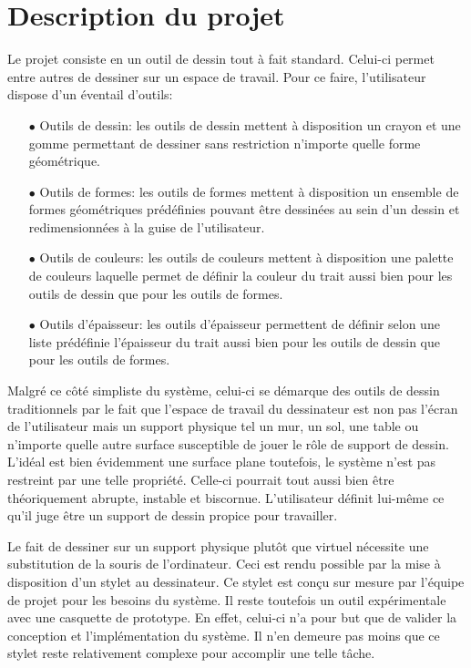 \documentclass[11pt,a4paper,oldfontcommands]{memoir}
\begin{document}
\section{Description du projet}

Le projet consiste en un outil de dessin tout à fait standard. Celui-ci permet entre autres de dessiner sur un espace de travail. Pour ce faire, l'utilisateur dispose d'un éventail d'outils:

\begin{itemize}
\item[$\bullet$] Outils de dessin: les outils de dessin mettent à disposition un crayon et une gomme permettant de dessiner sans restriction n'importe quelle forme géométrique.
\item[$\bullet$] Outils de formes: les outils de formes mettent à disposition un ensemble de formes géométriques prédéfinies pouvant être dessinées au sein d'un dessin et redimensionnées à la guise de l'utilisateur.
\item[$\bullet$] Outils de couleurs: les outils de couleurs mettent à disposition une palette de couleurs laquelle permet de définir la couleur du trait aussi bien pour les outils de dessin que pour les outils de formes.
\item[$\bullet$] Outils d'épaisseur: les outils d'épaisseur permettent de définir selon une liste prédéfinie l'épaisseur du trait aussi bien pour les outils de dessin que pour les outils de formes.
\end{itemize}

Malgré ce côté simpliste du système, celui-ci se démarque des outils de dessin traditionnels par le fait que l'espace de travail du dessinateur est non pas l'écran de l'utilisateur mais un support physique tel un mur, un sol, une table ou n'importe quelle autre surface susceptible de jouer le rôle de support de dessin. L'idéal est bien évidemment une surface plane toutefois, le système n'est pas restreint par une telle propriété. Celle-ci pourrait tout aussi bien être théoriquement abrupte, instable et biscornue. L'utilisateur définit lui-même ce qu'il juge être un support de dessin propice pour travailler.

Le fait de dessiner sur un support physique plutôt que virtuel nécessite une substitution de la souris de l'ordinateur. Ceci est rendu possible par la mise à disposition d'un stylet au dessinateur. Ce stylet est conçu sur mesure par l'équipe de projet pour les besoins du système. Il reste toutefois un outil expérimentale avec une casquette de prototype. En effet, celui-ci n'a pour but que de valider la conception et l'implémentation du système. Il n'en demeure pas moins que ce stylet reste relativement complexe pour accomplir une telle tâche.
\end{document}
